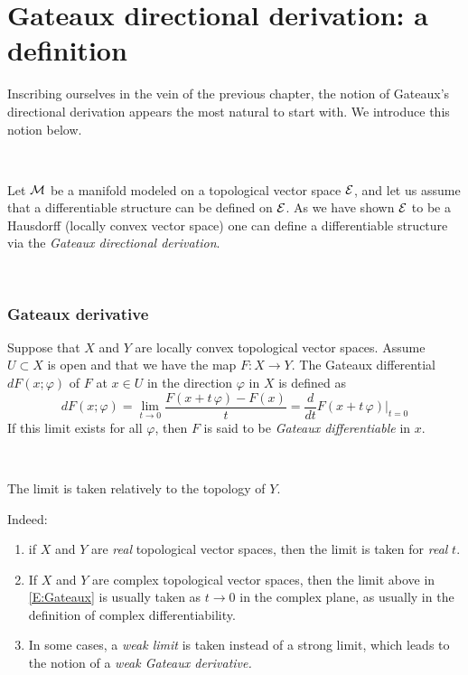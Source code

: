 \section{Gateaux directional derivation: a definition} Inscribing ourselves in the vein of the previous chapter, the notion of Gateaux's directional derivation appears the most natural to start with. We introduce this notion below. 

\,

Let $\mathcal{M}$ be a manifold  modeled on a topological vector space $\mathcal{E}$, and let us assume  that a differentiable structure can be defined on $\mathcal{E}$. As we have shown $\mathcal{E}$ to be a Hausdorff (locally convex vector space) one can define a differentiable structure via the \emph{Gateaux directional derivation}.

\, 

\subsubsection{Gateaux derivative}
Suppose that $X$ and $Y$ are locally convex topological vector spaces. Assume $U \subset X$  is open and that we have the map $F: X \to Y$. The Gateaux differential $dF(x;\varphi )$ of $F$ at $x \in U$ in the direction $\varphi$ in $X$ is defined as
\begin{equation}\label{E:Gateaux}
 dF ( x ; \varphi ) = \lim_{t \to 0} \frac{F(x +t\, \varphi) - F ( x )}{ t} = \frac{d}{d t} F( x +t\,\varphi )\vert_{t=0}
 \end{equation}
If this limit exists for all $\varphi$, then $ F$ is said to be \emph{Gateaux differentiable} in $x$.

\, 

The limit  is taken relatively to the topology of $Y$.

Indeed:
\begin{enumerate}
\item if $X$ and $Y$ are {\it real} topological vector spaces, then the limit is taken for {\it real} $t$. 
\item If $X$ and $Y$ are complex topological vector spaces, then the limit above in \eqref{E:Gateaux} is usually taken as $t \to 0 $ in the complex plane, as usually in the definition of complex differentiability.
\item In some cases, a \emph{weak limit} is taken instead of a strong limit, which leads to the notion of a \emph{weak Gateaux derivative.}
\end{enumerate}

